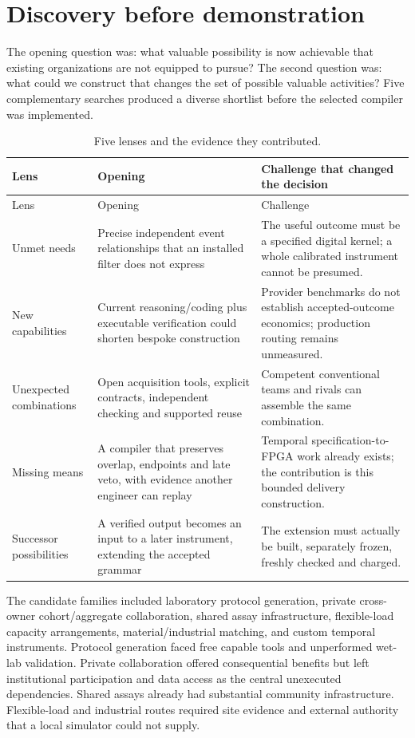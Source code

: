 \section{Discovery before demonstration}
The opening question was: what valuable possibility is now achievable that existing organizations are not equipped to pursue? The second question was: what could we construct that changes the set of possible valuable activities? Five complementary searches produced a diverse shortlist before the selected compiler was implemented.

\begin{longtable}{L{0.18\textwidth}L{0.36\textwidth}L{0.37\textwidth}}
\caption{Five lenses and the evidence they contributed.}\\
\toprule Lens & Opening & Challenge that changed the decision\\
\midrule\endfirsthead
\toprule Lens & Opening & Challenge\\\midrule\endhead
Unmet needs & Precise independent event relationships that an installed filter does not express & The useful outcome must be a specified digital kernel; a whole calibrated instrument cannot be presumed.\\
New capabilities & Current reasoning/coding plus executable verification could shorten bespoke construction & Provider benchmarks do not establish accepted-outcome economics; production routing remains unmeasured.\\
Unexpected combinations & Open acquisition tools, explicit contracts, independent checking and supported reuse & Competent conventional teams and rivals can assemble the same combination.\\
Missing means & A compiler that preserves overlap, endpoints and late veto, with evidence another engineer can replay & Temporal specification-to-FPGA work already exists; the contribution is this bounded delivery construction.\\
Successor possibilities & A verified output becomes an input to a later instrument, extending the accepted grammar & The extension must actually be built, separately frozen, freshly checked and charged.\\
\bottomrule
\end{longtable}

The candidate families included laboratory protocol generation, private cross-owner cohort/aggregate collaboration, shared assay infrastructure, flexible-load capacity arrangements, material/industrial matching, and custom temporal instruments. Protocol generation faced free capable tools and unperformed wet-lab validation. Private collaboration offered consequential benefits but left institutional participation and data access as the central unexecuted dependencies. Shared assays already had substantial community infrastructure. Flexible-load and industrial routes required site evidence and external authority that a local simulator could not supply.

